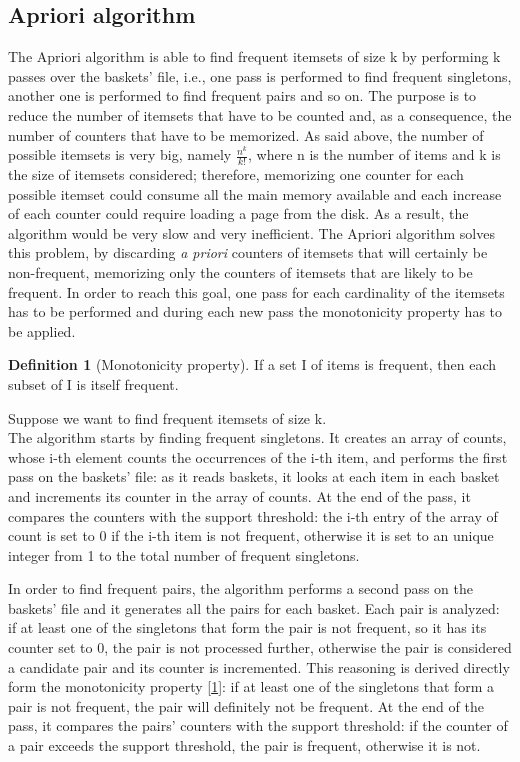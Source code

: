 \documentclass[conference,compsoc]{IEEEtran}
\theoremstyle{definition}
\newtheorem{definition}{Definition}[section]
\begin{document}
\subsection{Apriori algorithm}
The Apriori algorithm is able to find frequent itemsets of size k by performing k passes over the baskets' file, i.e., one pass is performed to find frequent singletons, another one is performed to find frequent pairs and so on. The purpose is to reduce the number of itemsets that have to be counted and, as a consequence, the number of counters that have to be memorized. As said above, the number of possible itemsets is very big, namely \( \frac{n^k}{k!}\), where n is the number of items and k is the size of itemsets considered; therefore, memorizing one counter for each possible itemset could consume all the main memory available and each increase of each counter could require loading a page from the disk. As a result, the algorithm would be very slow and very inefficient. The Apriori algorithm solves this problem, by discarding \emph{a priori} counters of itemsets that will certainly be non-frequent, memorizing only the counters of itemsets that are likely to be frequent. In order to reach this goal, one pass for each cardinality of the itemsets has to be performed and during each new pass the monotonicity property has to be applied.

\begin{definition}[Monotonicity property]\label{def:3.1}
If a set I of items is frequent, then each subset of I is itself frequent.
\end{definition}
Suppose we want to find frequent itemsets of size k. \\
The algorithm starts by finding frequent singletons. It creates an array of counts, whose i-th element counts the occurrences of the i-th item, and performs the first pass on the baskets' file: as it reads baskets, it looks at each item in each basket and increments its counter in the array of counts. At the end of the pass, it compares the counters with the support threshold: the i-th entry of the array of count is set to 0 if the i-th item is not frequent, otherwise it is set to an unique integer from 1 to the total number of frequent singletons. 

In order to find frequent pairs, the algorithm performs a second pass on the baskets' file and it generates all the pairs for each basket. Each pair is analyzed: if at least one of the singletons that form the pair is not frequent, so it has its counter set to 0, the pair is not processed further, otherwise the pair is considered a candidate pair and its counter is incremented. This reasoning is derived directly form the monotonicity property [\ref{def:3.1}]: if at least one of the singletons that form a pair is not frequent, the pair will definitely not be frequent. At the end of the pass, it compares the pairs' counters with the support threshold: if the counter of a pair exceeds the support threshold, the pair is frequent, otherwise it is not.
\end{document}
